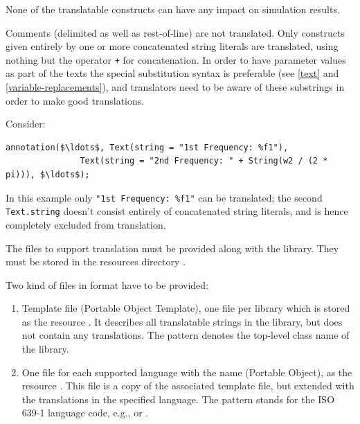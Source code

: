 \begin{nonnormative}
None of the translatable constructs can have any impact on simulation results.
\end{nonnormative}

Comments (delimited as well as rest-of-line) are not translated.
Only constructs given entirely by one or more concatenated string literals are translated, using nothing but the operator \lstinline!+! for concatenation.
In order to have parameter values as part of the texts the special substitution syntax is preferable (see \cref{text} and \cref{variable-replacements}), and translators need to be aware of these substrings in order to make good translations.

\begin{example}
Consider:
\begin{lstlisting}[language=modelica]
annotation($\ldots$, Text(string = "1st Frequency: %f1"),
               Text(string = "2nd Frequency: " + String(w2 / (2 * pi))), $\ldots$);
\end{lstlisting}
In this example only \lstinline!"1st Frequency: %f1"! can be translated; the second \lstinline!Text.string! doesn't consist entirely of concatenated string literals, and is hence completely excluded from translation.
\end{example}

The files to support translation must be provided along with the library.
They must be stored in the resources directory .

Two kind of files in \textcite{GettextManual} format have to be provided:
\begin{enumerate}
\item Template file  (Portable Object Template), one file per library which is stored as the resource .
It describes all translatable strings in the library, but does not contain any translations.
The pattern  denotes the top-level class name of the library.
\item One file for each supported language with the name  (Portable Object), as the resource .
This file is a copy of the associated template file, but extended with the translations in the specified language.
The pattern  stands for the ISO 639-1 language code, e.g.,  or .
\end{enumerate}

